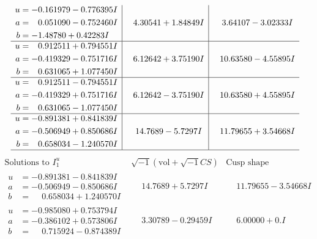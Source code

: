 \documentclass[1p]{elsarticle_modified}
\theoremstyle{definition}
\newcommand{\I}{\sqrt{-1}}
\begin{document}
$$\begin{array}{c|c|c}
\begin{aligned}
u &= -0.161979 - 0.776395 I \\
a &= \phantom{-}0.051090 - 0.752460 I \\
b &= -1.48780 + 0.42283 I\end{aligned}
 & \phantom{-}4.30541 + 1.84849 I & \phantom{-}3.64107 - 3.02333 I \\ \hline\begin{aligned}
u &= \phantom{-}0.912511 + 0.794551 I \\
a &= -0.419329 - 0.751716 I \\
b &= \phantom{-}0.631065 + 1.077450 I\end{aligned}
 & \phantom{-}6.12642 + 3.75190 I & \phantom{-}10.63580 - 4.55895 I \\ \hline\begin{aligned}
u &= \phantom{-}0.912511 - 0.794551 I \\
a &= -0.419329 + 0.751716 I \\
b &= \phantom{-}0.631065 - 1.077450 I\end{aligned}
 & \phantom{-}6.12642 - 3.75190 I & \phantom{-}10.63580 + 4.55895 I \\ \hline\begin{aligned}
u &= -0.891381 + 0.841839 I \\
a &= -0.506949 + 0.850686 I \\
b &= \phantom{-}0.658034 - 1.240570 I\end{aligned}
 & \phantom{-}14.7689 - 5.7297 I & \phantom{-}11.79655 + 3.54668 I\\
 \hline 
 \end{array}$$\newpage$$\begin{array}{c|c|c}  
\text{Solutions to }I^u_{1}& \I (\text{vol} + \sqrt{-1}CS) & \text{Cusp shape}\\
 \hline 
\begin{aligned}
u &= -0.891381 - 0.841839 I \\
a &= -0.506949 - 0.850686 I \\
b &= \phantom{-}0.658034 + 1.240570 I\end{aligned}
 & \phantom{-}14.7689 + 5.7297 I & \phantom{-}11.79655 - 3.54668 I \\ \hline\begin{aligned}
u &= -0.985080 + 0.753794 I \\
a &= -0.386102 + 0.573806 I \\
b &= \phantom{-}0.715924 - 0.874389 I\end{aligned}
 & \phantom{-}3.30789 - 0.29459 I & \phantom{-}6.00000 + 0. I\phantom{ +0.000000I} \\ \hline\begin{aligned}

\end{aligned}
\end{array}$$
\end{document}

